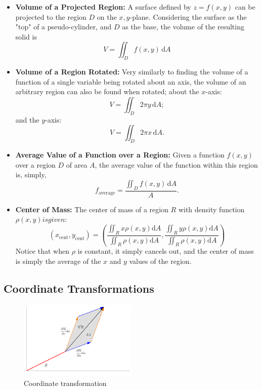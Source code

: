 \documentclass[12pt]{article}
\begin{document}
{\begin{itemize}
    \item \textbf{Volume of a Projected Region:} A surface defined by $z = f(x,y)$ can be projected to the region $D$ on the $x,y$-plane. Considering the surface as the "top" of a pseudo-cylinder, and $D$ as the base, the volume of the resulting solid is \[V = \iint_D f(x,y) \,\text{d}A\]
    \item \textbf{Volume of a Region Rotated:} Very similarly to finding the volume of a function of a single variable being rotated about an axis, the volume of an arbitrary region can also be found when rotated; about the $x$-axis: \[V = \iint_D 2\pi y \, \text{d}A;\] and the $y$-axis: \[V = \iint_D 2\pi x\, \text{d}A. \]
    \item \textbf{Average Value of a Function over a Region:} Given a function $f(x,y)$ over a region $D$ of area $A$, the average value of the function within this region is, simply, \[f_{\text{average}} = \frac{\iint_D f(x,y) \, \text{d}A}{A}.\]
    \item \textbf{Center of Mass:} The center of mass of a region $R$ with density function $\rho(x,y) is given: $\[(x_{\text{cent}}, y_{\text{cent}}) = \left(\frac{\iint_R x\rho(x,y) \text{d}A}{\iint_R \rho(x,y) \text{d}A}, \frac{\iint_R y\rho(x,y) \text{d}A}{\iint_R \rho(x,y) \text{d}A}\right)\] Notice that when $\rho$ is constant, it simply cancels out, and the center of mass is simply the average of the $x$ and $y$ values of the region.
\end{itemize}

\subsection{Coordinate Transformations}

\begin{figure}[!ht]
    \centering
    \includegraphics[width=0.5\textwidth]{./misc/transformationofvariables.png}
    \caption{Coordinate transformation}
    \label{fig:coordinate_transformations}
\end{figure}

}
\end{document}
